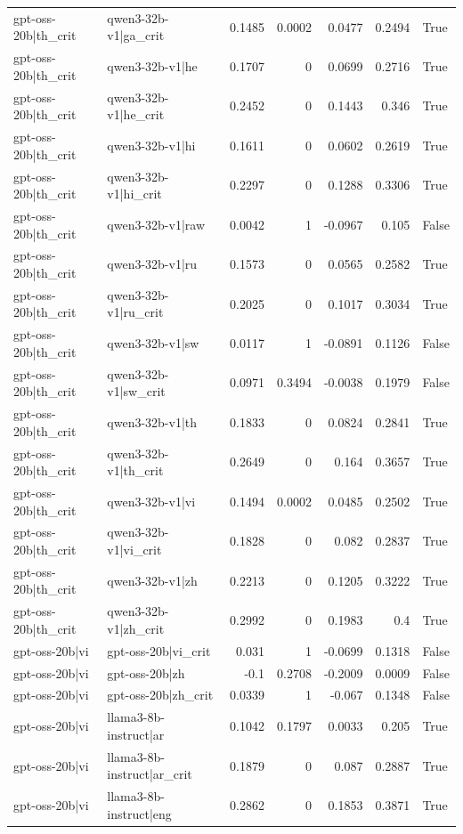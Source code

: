 \begin{table}
\begin{tabular}{l l r r r r l}
gpt-oss-20b|th_crit & qwen3-32b-v1|ga_crit & 0.1485 & 0.0002 & 0.0477 & 0.2494 & True \\
gpt-oss-20b|th_crit & qwen3-32b-v1|he & 0.1707 & 0 & 0.0699 & 0.2716 & True \\
gpt-oss-20b|th_crit & qwen3-32b-v1|he_crit & 0.2452 & 0 & 0.1443 & 0.346 & True \\
gpt-oss-20b|th_crit & qwen3-32b-v1|hi & 0.1611 & 0 & 0.0602 & 0.2619 & True \\
gpt-oss-20b|th_crit & qwen3-32b-v1|hi_crit & 0.2297 & 0 & 0.1288 & 0.3306 & True \\
gpt-oss-20b|th_crit & qwen3-32b-v1|raw & 0.0042 & 1 & -0.0967 & 0.105 & False \\
gpt-oss-20b|th_crit & qwen3-32b-v1|ru & 0.1573 & 0 & 0.0565 & 0.2582 & True \\
gpt-oss-20b|th_crit & qwen3-32b-v1|ru_crit & 0.2025 & 0 & 0.1017 & 0.3034 & True \\
gpt-oss-20b|th_crit & qwen3-32b-v1|sw & 0.0117 & 1 & -0.0891 & 0.1126 & False \\
gpt-oss-20b|th_crit & qwen3-32b-v1|sw_crit & 0.0971 & 0.3494 & -0.0038 & 0.1979 & False \\
gpt-oss-20b|th_crit & qwen3-32b-v1|th & 0.1833 & 0 & 0.0824 & 0.2841 & True \\
gpt-oss-20b|th_crit & qwen3-32b-v1|th_crit & 0.2649 & 0 & 0.164 & 0.3657 & True \\
gpt-oss-20b|th_crit & qwen3-32b-v1|vi & 0.1494 & 0.0002 & 0.0485 & 0.2502 & True \\
gpt-oss-20b|th_crit & qwen3-32b-v1|vi_crit & 0.1828 & 0 & 0.082 & 0.2837 & True \\
gpt-oss-20b|th_crit & qwen3-32b-v1|zh & 0.2213 & 0 & 0.1205 & 0.3222 & True \\
gpt-oss-20b|th_crit & qwen3-32b-v1|zh_crit & 0.2992 & 0 & 0.1983 & 0.4 & True \\
gpt-oss-20b|vi & gpt-oss-20b|vi_crit & 0.031 & 1 & -0.0699 & 0.1318 & False \\
gpt-oss-20b|vi & gpt-oss-20b|zh & -0.1 & 0.2708 & -0.2009 & 0.0009 & False \\
gpt-oss-20b|vi & gpt-oss-20b|zh_crit & 0.0339 & 1 & -0.067 & 0.1348 & False \\
gpt-oss-20b|vi & llama3-8b-instruct|ar & 0.1042 & 0.1797 & 0.0033 & 0.205 & True \\
gpt-oss-20b|vi & llama3-8b-instruct|ar_crit & 0.1879 & 0 & 0.087 & 0.2887 & True \\
gpt-oss-20b|vi & llama3-8b-instruct|eng & 0.2862 & 0 & 0.1853 & 0.3871 & True \\

\end{tabular}
\end{table}
